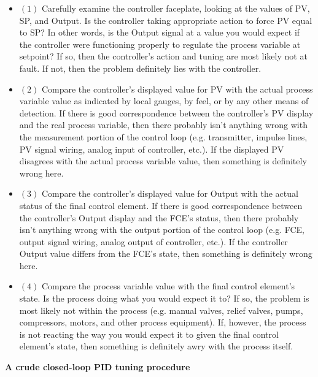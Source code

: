 \documentclass[12pt,a4paper]{book}
\begin{document}
\begin{itemize}
\item{$(1)$}  Carefully examine the controller faceplate, looking at the values of PV, SP, and Output.  Is the controller taking appropriate action to force PV equal to SP?  In other words, is the Output signal at a value you would expect if the controller were functioning properly to regulate the process variable at setpoint?  If so, then the controller's action and tuning are most likely not at fault.  If not, then the problem definitely lies with the controller.
\item{$(2)$}  Compare the controller's displayed value for PV with the actual process variable value as indicated by local gauges, by feel, or by any other means of detection.  If there is good correspondence between the controller's PV display and the real process variable, then there probably isn't anything wrong with the measurement portion of the control loop (e.g. transmitter, impulse lines, PV signal wiring, analog input of controller, etc.).  If the displayed PV disagrees with the actual process variable value, then something is definitely wrong here.
\item{$(3)$}  Compare the controller's displayed value for Output with the actual status of the final control element.  If there is good correspondence between the controller's Output display and the FCE's status, then there probably isn't anything wrong with the output portion of the control loop (e.g. FCE, output signal wiring, analog output of controller, etc.).  If the controller Output value differs from the FCE's state, then something is definitely wrong here.
\item{$(4)$}  Compare the process variable value with the final control element's state.  Is the process doing what you would expect it to?  If so, the problem is most likely not within the process (e.g. manual valves, relief valves, pumps, compressors, motors, and other process equipment).  If, however, the process is not reacting the way you would expect it to given the final control element's state, then something is definitely awry with the process itself.
\end{itemize}






\vfil \eject

\centerline{\bf A crude closed-loop PID tuning procedure}
\end{document}
